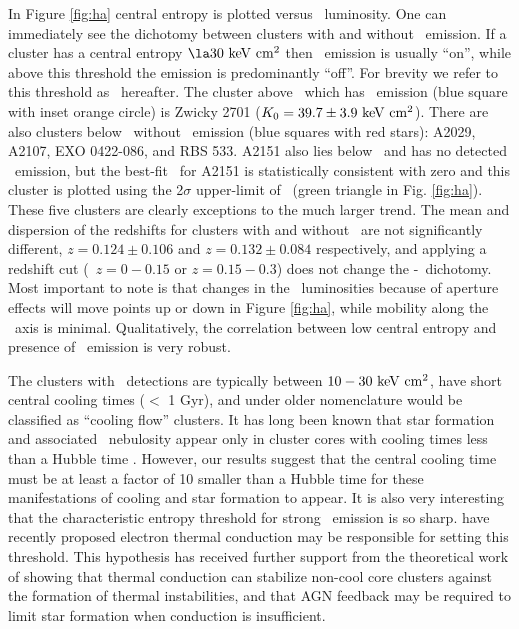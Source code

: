 \documentclass[12pt,preprint]{aastex}
\begin{document}
In Figure \ref{fig:ha} central entropy is plotted versus
\halpha\ luminosity. One can immediately see the dichotomy between
clusters with and without \halpha\ emission. If a cluster has a
central entropy $\la 30 \ent$ then \halpha\ emission is usually
``on'', while above this threshold the emission is predominantly
``off''. For brevity we refer to this threshold as
\kthr\ hereafter. The cluster above \kthr\ which has \halpha\ emission
(blue square with inset orange circle) is Zwicky 2701 ($K_0 = 39.7
\pm 3.9 \mathrm{\mbox{\ensuremath{\mathrm{~keV}}} \mathrm{\mbox{\ensuremath{\mathrm{~cm}}}^2}}$). There are also clusters below \kthr\ without
\halpha\ emission (blue squares with red stars): A2029, A2107, EXO
0422-086, and RBS 533. A2151 also lies below \kthr\ and has no
detected \halpha\ emission, but the best-fit \kna\ for A2151 is
statistically consistent with zero and this cluster is plotted using
the 2$\sigma$ upper-limit of \kna\ (green triangle in
Fig. \ref{fig:ha}).  These five clusters are clearly exceptions to the
much larger trend. The mean and dispersion of the redshifts for
clusters with and without \halpha\ are not significantly different,
$z = 0.124 \pm 0.106$ and $z = 0.132 \pm 0.084$ respectively, and
applying a redshift cut (\ie\ $z = 0-0.15$ or $z = 0.15-0.3$) does not
change the \kna-\halpha\ dichotomy. Most important to note is that
changes in the \halpha\ luminosities because of aperture effects will
move points up or down in Figure \ref{fig:ha}, while mobility along
the \kna\ axis is minimal. Qualitatively, the correlation between low
central entropy and presence of \halpha\ emission is very robust.

The clusters with \halpha\ detections are typically between $10-30
\mathrm{\mbox{\ensuremath{\mathrm{~keV}}} \mathrm{\mbox{\ensuremath{\mathrm{~cm}}}^2}}$, have short central cooling times ($<$ 1 Gyr), and under older
nomenclature would be classified as ``cooling flow'' clusters.  It has
long been known that star formation and associated \halpha\ nebulosity
appear only in cluster cores with cooling times less than a Hubble
time \citep{hu85, johnstone87, mcnamara89, voit97,cardiel98}. However,
our results suggest that the central cooling time must be at least a
factor of 10 smaller than a Hubble time for these manifestations of
cooling and star formation to appear.  It is also very interesting
that the characteristic entropy threshold for strong \halpha\ emission
is so sharp. \cite{conduction} have recently proposed electron thermal
conduction may be responsible for setting this threshold. This
hypothesis has received further support from the theoretical work of
\cite{2008arXiv0804.3823G} showing that thermal conduction can
stabilize non-cool core clusters against the formation of thermal
instabilities, and that AGN feedback may be required to limit star
formation when conduction is insufficient.
\end{document}
